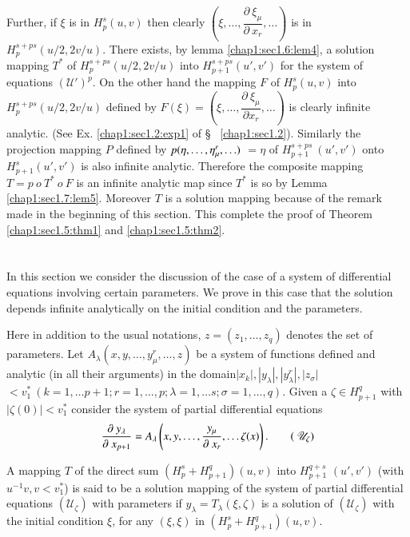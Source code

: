 Further,  if $\xi $ is in $H^s_p(u, v)$ then clearly $\left(\xi,  \ldots,
\dfrac{\partial ~ \xi_\mu}{\partial ~ x_r},  \ldots\right)$ is in\break 
$H^{s+ps}_p (u/2, 2v/u)$. There exists,  by lemma
\ref{chap1:sec1.6:lem4},  a solution 
mapping $T^*$ of $H^{s+ps}_p(u/2, 2v/u)$ into $H^{s+ps}_{p+1}(u', v')$
for the system of equations $(\mathscr{U}')^p$.  On the other hand the
mapping $F$ of $H^s_{p}(u, v)$ into $H^{s+ps}_p (u/2, 2v/u)$ defined
by $F(\xi) = \left(\xi, \ldots,  \dfrac{\partial ~\xi_\mu}{\partial x_r},
\ldots\right)$ is clearly infinite analytic. (See
Ex. \ref{chap1:sec1.2:exp1} of \S ~ 
\ref{chap1:sec1.2}). Similarly the projection mapping $P$ defined by $p(\eta,
\ldots,\break  \eta^r_\mu,  \ldots)$ $= \eta$ of $H^{s+ps}_{p+1} ~ (u', v')$
onto $H^s_{p+1}(u', v')$ is also infinite analytic. Therefore the
composite mapping $T = p ~ o ~ T^* ~ o ~ F$ is an infinite analytic
map since $T^*$ is so by Lemma \ref{chap1:sec1.7:lem5}. Moreover $T$
is a solution mapping 
because of the remark made in the beginning of this section. This
complete the proof of  Theorem \ref{chap1:sec1.5:thm1}
and \ref{chap1:sec1.5:thm2}.  

\section{}\label{chap1:sec1.9} %

In this section we consider the discussion of the case of a system of
differential equations involving certain parameters. We prove in this
case that the solution depends infinite analytically on the initial
condition and the parameters. 

Here in addition to the usual notations,  $z = (z_1,  \ldots,  z_q)$
denotes the set of parameters. Let $A_\lambda (x, y, \ldots,  y^r_\mu,
\ldots,  z)$ be a system of functions defined and analytic (in all
their arguments) in the domain\pageoriginale $| x_k |,  | y_\lambda |,  |y^r_\lambda
|,  | z_\sigma |$ $< v^*_1 ~ (k=1,  \ldots p+1; r=1,  \ldots,  p;
\lambda = 1,  \ldots s; \sigma =1,  \ldots,  q)$. Given a $\zeta \in
H^q_{p+1}$ with $| \zeta (0) | < v^*_1$ consider the system of partial
differential equations 
\begin{equation}
  \frac{\partial ~ y_\lambda}{\partial ~ x_{p+1}} = A_\lambda \left(x, y,
  \ldots,  \frac{y_\mu}{\partial ~ x_r},  \ldots \zeta(x)\right). \tag{
    $\mathscr{U}_\zeta$} 
\end{equation}

\begin{defi*}%
  A mapping $T$ of the direct sum $(H^s_p + H^q_{p+1}) (u, v)$ into
  $H^{q+s}_{p+1}$ $(u', v')$ (with $u^{-1} v,  v < v^*_1$) is said to be
  a solution mapping of the system of partial differential equations
  $(\mathscr{U}_\zeta)$ with parameters if $y_\lambda = T_\lambda
  (\xi,  \zeta)$ is a solution of $(\mathscr{U}_\zeta)$ with the
  initial condition $\xi$,  for any $(\xi, \xi)$ in $(H^s_p +
  H^q_{p+1}) (u, v)$.  
\end{defi*}

